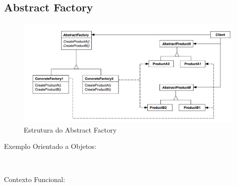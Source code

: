 \subsection{Abstract Factory}


\begin{figure}[htb]
	\caption{\label{fig_grafico}Estrutura do Abstract Factory}
	\begin{center}
	    \includegraphics[scale=0.5]{5_padroes-contexto-funcional/5.1_criacionais/5.1.2_abstract-factory/diagram.png}
	\end{center}
\end{figure}

Exemplo Orientado a Objetos:

\begin{lstlisting}[caption={Abstract Factory Orientado a Objetos},label=oostrategy]
    

\end{lstlisting}

Contexto Funcional:

\begin{lstlisting}[caption={Abstract Factory Funcional},label=fpabfactory]
    
    

\end{lstlisting}